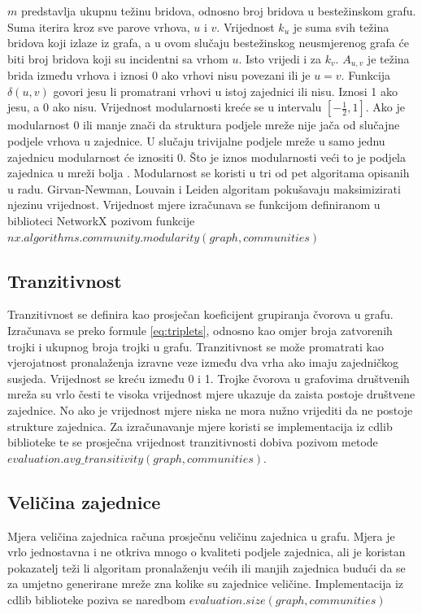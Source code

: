 \documentclass[times, utf8, diplomski]{fer}
\begin{document}
$m$ predstavlja ukupnu težinu bridova, odnosno broj bridova u bestežinskom grafu. Suma iterira kroz sve parove vrhova, $u$ i $v$. Vrijednost $k_{u}$ je suma svih težina bridova koji izlaze iz grafa, a u ovom slučaju bestežinskog neusmjerenog grafa će biti broj bridova koji su incidentni sa vrhom $u$. Isto vrijedi i za $k_{v}$. $A_{u,v}$ je težina brida između vrhova i iznosi 0 ako vrhovi nisu povezani ili je $u=v$. Funkcija $\delta(u,v)$ govori jesu li promatrani vrhovi u istoj zajednici ili nisu. Iznosi 1 ako jesu, a 0 ako nisu. Vrijednost modularnosti kreće se u intervalu $[ -\frac{1}{2}, 1 ]$. Ako je modularnost 0 ili manje znači da struktura podjele mreže nije jača od slučajne podjele vrhova u zajednice. U slučaju trivijalne podjele mreže u samo jednu zajednicu modularnost će iznositi 0. Što je iznos modularnosti veći to je podjela zajednica u mreži bolja \cite{brandes2007modularity}. Modularnost se koristi u tri od pet algoritama opisanih u radu. Girvan-Newman, Louvain i Leiden algoritam pokušavaju maksimizirati njezinu vrijednost. Vrijednost mjere izračunava se funkcijom definiranom u biblioteci NetworkX pozivom funkcije $nx.algorithms.community.modularity(graph, communities)$



\subsection{Tranzitivnost}
Tranzitivnost se definira kao prosječan koeficijent grupiranja čvorova u grafu. Izračunava se preko formule \ref{eq:triplets}, odnosno kao omjer broja zatvorenih trojki i ukupnog broja trojki u grafu. Tranzitivnost se može promatrati kao vjerojatnost pronalaženja izravne veze između dva vrha ako imaju zajedničkog susjeda. Vrijednost se kreću između 0 i 1. Trojke čvorova u grafovima društvenih mreža su vrlo česti te visoka vrijednost mjere ukazuje da zaista postoje društvene zajednice. No ako je vrijednost mjere niska ne mora nužno vrijediti da ne postoje strukture zajednica. Za izračunavanje mjere koristi se implementacija iz cdlib biblioteke te se prosječna vrijednost tranzitivnosti dobiva pozivom metode $evaluation.avg\_transitivity(graph, communities)$.


\subsection{Veličina zajednice}
Mjera veličina zajednica računa prosječnu veličinu zajednica u grafu. Mjera je vrlo jednostavna i ne otkriva mnogo o kvaliteti podjele zajednica, ali je koristan pokazatelj teži li algoritam pronalaženju većih ili manjih zajednica budući da se za umjetno generirane mreže zna kolike su zajednice veličine. Implementacija iz cdlib biblioteke poziva se naredbom $evaluation.size(graph,communities)$
\end{document}

